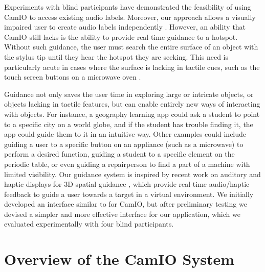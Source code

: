 \documentclass[runningheads]{res/templates/llncs}
\begin{document}
Experiments with blind participants have demonstrated the feasibility of
using CamIO to access existing audio labels. Moreover, our approach
allows a visually impaired user to create audio labels independently
\cite{coughlanTowardsAccessibleAudioLabeling2020}. However, an ability
that CamIO still lacks is the ability to provide real-time guidance to a
hotspot. Without such guidance, the user must search the entire surface
of an object with the stylus tip until they hear the hotspot they are
seeking. This need is particularly acute in cases where the surface is
lacking in tactile cues, such as the touch screen buttons on a microwave
oven \cite{coughlanTowardsAccessibleAudioLabeling2020}.

Guidance not only saves the user time in exploring large or intricate
objects, or objects lacking in tactile features, but can enable entirely
new ways of interacting with objects. For instance, a geography learning
app could ask a student to point to a specific city on a world globe,
and if the student has trouble finding it, the app could guide them to
it in an intuitive way. Other examples could include guiding a user to a
specific button on an appliance (such as a microwave) to perform a
desired function, guiding a student to a specific element on the
periodic table, or even guiding a repairperson to find a part of a
machine with limited visibility. Our guidance system is inspired by
recent work on auditory and haptic displays for 3D spatial guidance
\cite{mayAuditoryDisplaysFacilitate2019,guezou-philippePrototypingEvaluatingSensory2018},
which provide real-time audio/haptic feedback to guide a user towards a
target in a virtual environment. We initially developed an interface
similar to \cite{mayAuditoryDisplaysFacilitate2019} for CamIO, but after
preliminary testing we devised a simpler and more effective interface
for our application, which we evaluated experimentally with four blind
participants.

\hypertarget{overview}{%
\section{Overview of the CamIO System}\label{overview}}
\end{document}
